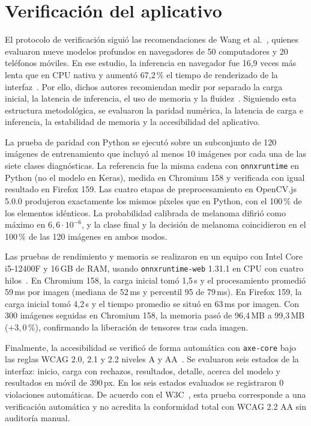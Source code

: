 \section{Verificación del aplicativo}

El protocolo de verificación siguió las recomendaciones de Wang et al.~\cite{wang2025browser}, quienes evaluaron nueve modelos profundos en navegadores de 50 computadores y 20 teléfonos móviles. En ese estudio, la inferencia en navegador fue 16,9 veces más lenta que en CPU nativa y aumentó 67,2\,\% el tiempo de renderizado de la interfaz~\cite{wang2025browser}. Por ello, dichos autores recomiendan medir por separado la carga inicial, la latencia de inferencia, el uso de memoria y la fluidez~\cite{wang2025browser}. Siguiendo esta estructura metodológica, se evaluaron la paridad numérica, la latencia de carga e inferencia, la estabilidad de memoria y la accesibilidad del aplicativo.

La prueba de paridad con Python se ejecutó sobre un subconjunto de 120 imágenes de entrenamiento que incluyó al menos 10 imágenes por cada una de las siete clases diagnósticas. La referencia fue la misma cadena con \texttt{onnxruntime} en Python (no el modelo en Keras), medida en Chromium 158 y verificada con igual resultado en Firefox 159. Las cuatro etapas de preprocesamiento en OpenCV.js 5.0.0 produjeron exactamente los mismos píxeles que en Python, con el 100\,\% de los elementos idénticos. La probabilidad calibrada de melanoma difirió como máximo en $6{,}6 \cdot 10^{-6}$, y la clase final y la decisión de melanoma coincidieron en el 100\,\% de las 120 imágenes en ambos modos.

Las pruebas de rendimiento y memoria se realizaron en un equipo con Intel Core i5-12400F y 16\,GB de RAM, usando \texttt{onnxruntime-web} 1.31.1 en CPU con cuatro hilos~\cite{ning2024onnxweb}. En Chromium 158, la carga inicial tomó 1,5\,s y el procesamiento promedió 59\,ms por imagen (mediana de 52\,ms y percentil 95 de 79\,ms). En Firefox 159, la carga inicial tomó 4,2\,s y el tiempo promedio se situó en 63\,ms por imagen. Con 300 imágenes seguidas en Chromium 158, la memoria pasó de 96,4\,MB a 99,3\,MB ($+3{,}0$\,\%), confirmando la liberación de tensores tras cada imagen.

Finalmente, la accesibilidad se verificó de forma automática con \texttt{axe-core} bajo las reglas WCAG 2.0, 2.1 y 2.2 niveles A y AA~\cite{w3c2023wcag22}. Se evaluaron seis estados de la interfaz: inicio, carga con rechazos, resultados, detalle, acerca del modelo y resultados en móvil de 390\,px. En los seis estados evaluados se registraron 0 violaciones automáticas. De acuerdo con el W3C~\cite{w3c2023wcag22}, esta prueba corresponde a una verificación automática y no acredita la conformidad total con WCAG 2.2 AA sin auditoría manual.
